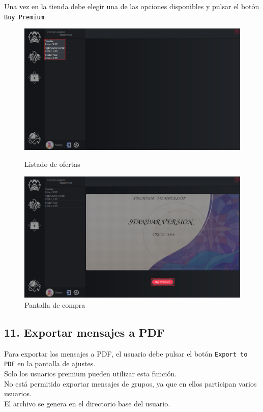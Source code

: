 Una vez en la tienda debe elegir una de las opciones disponibles y pulsar el botón \texttt{Buy Premium}.

\begin{figure}[H]
    \centering
    \begin{minipage}[b]{0.48\textwidth}
        \centering
        \includegraphics[width=\textwidth]{images/manualDeUsuario/HacerPremium2.png}
        \caption*{Listado de ofertas}
    \end{minipage}
    \hfill
    \begin{minipage}[b]{0.48\textwidth}
        \centering
        \includegraphics[width=\textwidth]{images/manualDeUsuario/HacerPremium3.png}
        \caption*{Pantalla de compra}
    \end{minipage}
\end{figure}

\subsection*{11. Exportar mensajes a PDF}
Para exportar los mensajes a PDF, el usuario debe pulsar el botón \texttt{Export to PDF} en la pantalla de ajustes.\\
Solo los usuarios premium pueden utilizar esta función.\\
No está permitido exportar mensajes de grupos, ya que en ellos participan varios usuarios.\\
El archivo se genera en el directorio base del usuario.

